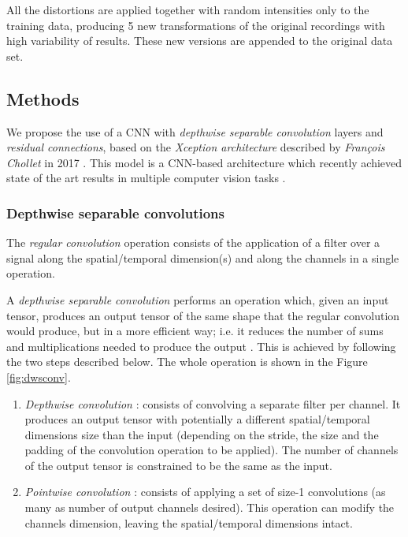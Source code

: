 \documentclass{elsarticle}
\begin{document}
All the distortions are applied together with random intensities only to the training data, producing 5 new transformations of the original recordings with high variability of results. These new versions are appended to the original data set.


\subsection{Methods}
We propose the use of a CNN with \textit{depthwise separable convolution} layers and \textit{residual connections}, based on the \textit{Xception architecture}  described by \textit{François Chollet} in 2017 \cite{FChollet2017}. This model is a CNN-based architecture which recently achieved state of the art results in multiple computer vision tasks \cite{Liu2019, Nazar2018, Song2018, Arriaga2017}. 

\subsubsection{Depthwise separable convolutions}
The \textit{regular convolution} operation consists of the application of a filter over a signal along the spatial/temporal dimension(s) and along the channels in a single operation. 

A \textit{depthwise separable convolution} performs an operation which, given an input tensor, produces an output tensor of the same shape that the regular convolution would produce, but in a more efficient way; i.e. it reduces the number of sums and multiplications needed to produce the output \cite{FChollet2017}. This is achieved by following the two steps described below. The whole operation is shown in the Figure \ref{fig:dwsconv}.



\begin{enumerate}
	\item \textit{Depthwise convolution} \cite{Yunhui2019}: consists of convolving a separate filter per channel. It produces an output tensor with potentially a different spatial/temporal dimensions size than the input (depending on the stride, the size and the padding of the convolution operation to be applied). The number of channels of the output tensor is constrained to be the same as the input.
	\item \textit{Pointwise convolution} \cite{Gao2018}: consists of applying a set of size-1 convolutions (as many as number of output channels desired). This operation can modify the channels dimension, leaving the spatial/temporal dimensions intact.
\end{enumerate}
\end{document}
